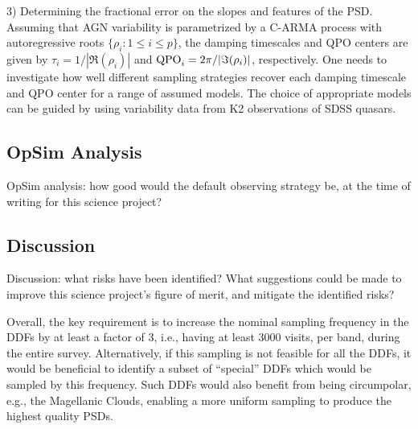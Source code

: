 3) Determining the fractional error on the slopes and features of the PSD.
Assuming that AGN variability is parametrized by a C-ARMA process with
autoregressive roots $\{\rho_{i}:1 \leq i \leq p\}$, the damping timescales and
QPO centers are given by $\tau_{i} = 1/|\Re(\rho_{i})|$ and ${\rm QPO}_{i} =
2\pi/|\Im(\rho_{i})|$, respectively. One needs to investigate how well different
sampling strategies recover each damping timescale and QPO center for a range of
assumed models. The choice of appropriate models can be guided by using
variability data from K2 observations of SDSS quasars.


\subsection{OpSim Analysis}
\label{sec:\secname:analysis}

OpSim analysis: how good would the default observing strategy be, at
the time of writing for this science project?



\subsection{Discussion}
\label{sec:\secname:discussion}

Discussion: what risks have been identified? What suggestions could be
made to improve this science project's figure of merit, and mitigate
the identified risks?

Overall, the key requirement is to increase the nominal sampling frequency
in the DDFs by at least a factor of 3, i.e., having at least 3000 visits,
per band, during the entire survey. Alternatively, if this sampling is not
feasible for all the DDFs, it would be beneficial to identify a subset of
``special'' DDFs which would be sampled by this frequency. Such DDFs would
also benefit from being circumpolar, e.g., the Magellanic Clouds, enabling
a more uniform sampling to produce the highest quality PSDs.


\navigationbar
